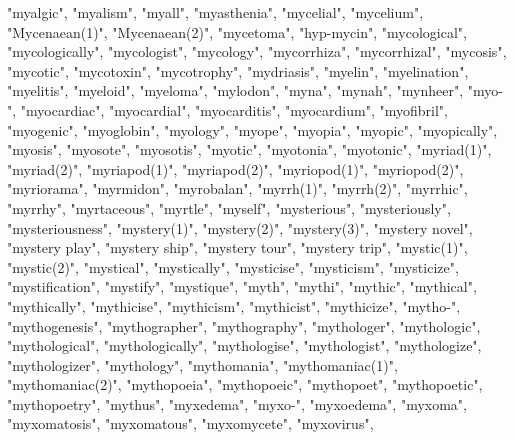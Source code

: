 "myalgic",
"myalism",
"myall",
"myasthenia",
"mycelial",
"mycelium",
"Mycenaean(1)",
"Mycenaean(2)",
"mycetoma",
"hyp-mycin",
"mycological",
"mycologically",
"mycologist",
"mycology",
"mycorrhiza",
"mycorrhizal",
"mycosis",
"mycotic",
"mycotoxin",
"mycotrophy",
"mydriasis",
"myelin",
"myelination",
"myelitis",
"myeloid",
"myeloma",
"mylodon",
"myna",
"mynah",
"mynheer",
"myo-",
"myocardiac",
"myocardial",
"myocarditis",
"myocardium",
"myofibril",
"myogenic",
"myoglobin",
"myology",
"myope",
"myopia",
"myopic",
"myopically",
"myosis",
"myosote",
"myosotis",
"myotic",
"myotonia",
"myotonic",
"myriad(1)",
"myriad(2)",
"myriapod(1)",
"myriapod(2)",
"myriopod(1)",
"myriopod(2)",
"myriorama",
"myrmidon",
"myrobalan",
"myrrh(1)",
"myrrh(2)",
"myrrhic",
"myrrhy",
"myrtaceous",
"myrtle",
"myself",
"mysterious",
"mysteriously",
"mysteriousness",
"mystery(1)",
"mystery(2)",
"mystery(3)",
"mystery novel",
"mystery play",
"mystery ship",
"mystery tour",
"mystery trip",
"mystic(1)",
"mystic(2)",
"mystical",
"mystically",
"mysticise",
"mysticism",
"mysticize",
"mystification",
"mystify",
"mystique",
"myth",
"mythi",
"mythic",
"mythical",
"mythically",
"mythicise",
"mythicism",
"mythicist",
"mythicize",
"mytho-",
"mythogenesis",
"mythographer",
"mythography",
"mythologer",
"mythologic",
"mythological",
"mythologically",
"mythologise",
"mythologist",
"mythologize",
"mythologizer",
"mythology",
"mythomania",
"mythomaniac(1)",
"mythomaniac(2)",
"mythopoeia",
"mythopoeic",
"mythopoet",
"mythopoetic",
"mythopoetry",
"mythus",
"myxedema",
"myxo-",
"myxoedema",
"myxoma",
"myxomatosis",
"myxomatous",
"myxomycete",
"myxovirus",
